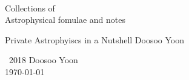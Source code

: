\documentclass[12pt, openany]{book}
\newcommand{\HRule}{\rule{\linewidth}{0.125mm}}
\newcommand\BackgroundPic{%
\put(-0,-0){%
\parbox[b][\paperheight]{\paperwidth}{%
\vfill
\centering
\vfill
}}}
\begin{document}
\AddToShipoutPicture*{\BackgroundPic}

\frontmatter

\begin{titlepage}

\ \\[1.25in]

%
%

{\sffamily \color{white}%
\begin{center}
\fontsize{22}{18}\selectfont
Collections of \\
\fontsize{32}{26}\selectfont
Astrophysical fomulae and notes
\end{center}
}
\vspace{0.5em}

\vfill


{\color{red}\sffamily Private Astrophyiscs in a Nutshell \hfill\color{black} Doosoo Yoon}

\end{titlepage}

\pagestyle{plain}

\null \vfill

\noindent \ccCopy\ 2018 Doosoo Yoon \\
\noindent \today



\clearpage


\end{document}
